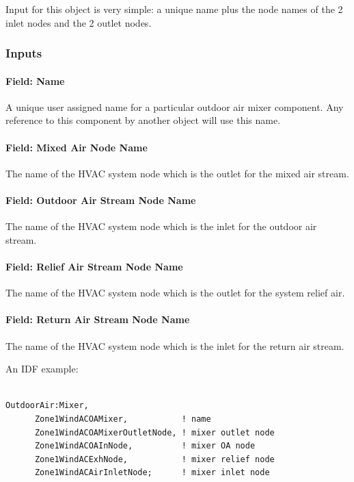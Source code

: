Input for this object is very simple: a unique name plus the node names of the 2 inlet nodes and the 2 outlet nodes.

\subsubsection{Inputs}\label{inputs-7-001}

\paragraph{Field: Name}\label{field-name-6-001}

A unique user assigned name for a particular outdoor air mixer component. Any reference to this component by another object will use this name.

\paragraph{Field: Mixed Air Node Name}\label{field-mixed-air-node-name}

The name of the HVAC system node which is the outlet for the mixed air stream.

\paragraph{Field: Outdoor Air Stream Node Name}\label{field-outdoor-air-stream-node-name}

The name of the HVAC system node which is the inlet for the outdoor air stream.

\paragraph{Field: Relief Air Stream Node Name}\label{field-relief-air-stream-node-name}

The name of the HVAC system node which is the outlet for the system relief air.

\paragraph{Field: Return Air Stream Node Name}\label{field-return-air-stream-node-name}

The name of the HVAC system node which is the inlet for the return air stream.

An IDF example:

\begin{lstlisting}

OutdoorAir:Mixer,
      Zone1WindACOAMixer,           ! name
      Zone1WindACOAMixerOutletNode, ! mixer outlet node
      Zone1WindACOAInNode,          ! mixer OA node
      Zone1WindACExhNode,           ! mixer relief node
      Zone1WindACAirInletNode;      ! mixer inlet node
\end{lstlisting}
